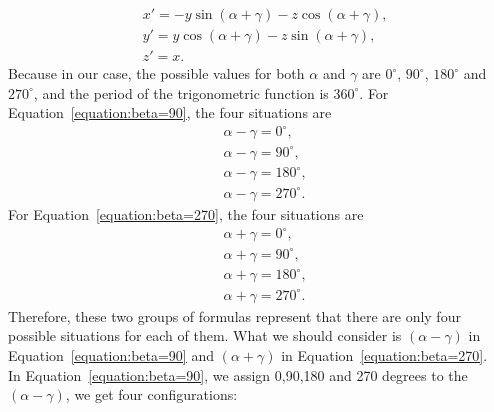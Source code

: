 \begin{equation}
\label{equation:beta=270}
\begin{aligned}
&x'=-y\sin(\alpha+\gamma)-z\cos(\alpha+\gamma), \\
&y'=y\cos(\alpha+\gamma)-z\sin(\alpha+\gamma), \\
&z'=x.
\end{aligned}
\end{equation}
Because in our case, the possible values for both $\alpha$ and $\gamma$ are $0^{\circ}$, $90^{\circ}$, $180^{\circ}$ and $270^{\circ}$, and the period of the trigonometric function is $360^{\circ}$. For Equation~\ref{equation:beta=90}, the four situations are
\begin{equation}
\begin{aligned}
&\alpha-\gamma=0^{\circ},\\
&\alpha-\gamma=90^{\circ},\\
&\alpha-\gamma=180^{\circ},\\
&\alpha-\gamma=270^{\circ}.
\end{aligned}
\end{equation}
For Equation~\ref{equation:beta=270}, the four situations are 
\begin{equation}
\begin{aligned}
&\alpha+\gamma=0^{\circ},\\
&\alpha+\gamma=90^{\circ},\\
&\alpha+\gamma=180^{\circ},\\
&\alpha+\gamma=270^{\circ}.
\end{aligned}
\end{equation}
Therefore, these two groups of formulas represent that there are only four possible situations for each of them. What we should consider is $(\alpha-\gamma)$ in Equation~\ref{equation:beta=90} and $(\alpha+\gamma)$ in Equation~\ref{equation:beta=270}. 
\\In Equation~\ref{equation:beta=90}, we assign 0,90,180 and 270 degrees to the $(\alpha-\gamma)$, we get four configurations:
